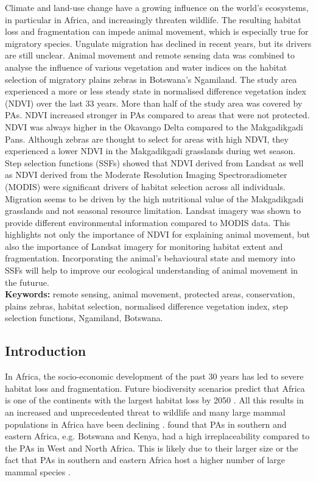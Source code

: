 \documentclass[12pt,a4paper, twoside, english]{article}
\begin{document}
Climate and land-use change have a growing influence on the world's ecosystems, in particular in Africa, and increasingly threaten wildlife. The resulting habitat loss and fragmentation can impede animal movement, which is especially true for migratory species. Ungulate migration has declined in recent years, but its drivers are still unclear. Animal movement and remote sensing data was combined to analyse the influence of various vegetation and water indices on the habitat selection of migratory plains zebras in Botswana's Ngamiland. The study area experienced a more or less steady state in normalised difference vegetation index (NDVI) over the last 33 years. More than half of the study area was covered by PAs. NDVI increased stronger in PAs compared to areas that were not protected. NDVI was always higher in the Okavango Delta compared to the Makgadikgadi Pans. Although zebras are thought to select for areas with high NDVI, they experienced a lower NDVI in the Makgadikgadi grasslands during wet season. Step selection functions (SSFs) showed that NDVI derived from Landsat as well as NDVI derived from the Moderate Resolution Imaging Spectroradiometer (MODIS) were significant drivers of habitat selection across all individuals. Migration seems to be driven by the high nutritional value of the Makgadikgadi grasslands and not seasonal resource limitation. Landsat imagery was shown to provide different environmental information compared to MODIS data. This highlights not only the importance of NDVI for explaining animal movement, but also the importance of Landsat imagery for monitoring habitat extent and fragmentation. Incorporating the animal's behavioural state and memory into SSFs will help to improve our ecological understanding of animal movement in the futurue. \\

\textbf{Keywords:} remote sensing, animal movement, protected areas, conservation, plains zebras, habitat selection, normalised difference vegetation index, step selection functions, Ngamiland, Botswana.

\subsection{Introduction}

In Africa, the socio-economic development of the past 30 years has led to severe habitat loss and fragmentation. Future biodiversity scenarios predict that Africa is one of the continents with the largest habitat loss by 2050 \citep{Visconti2011}. All this results in an increased and unprecedented threat to wildlife \citep{Brooks2002, Newmark2000, Newmark2008} and many large mammal populations in Africa have been declining \citep{Craigie2010}. \cite{Wegmann2014} found that PAs in southern and eastern Africa, e.g. Botswana and Kenya, had a high irreplaceability compared to the PAs in West and North Africa. This is likely due to their larger size or the fact that PAs in southern and eastern Africa host a higher number of large mammal species \citep{Rondinini2005}. 
\end{document}
